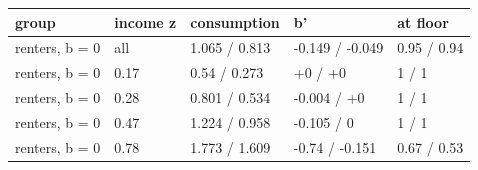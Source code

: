 \begingroup\small
\setlength{\tabcolsep}{3pt}
\renewcommand{\arraystretch}{1.04}
\begin{tabularx}{\linewidth}{XXXXX}
\toprule
group & income z & consumption & b' & at floor \\
\midrule
renters, b = 0 & all & 1.065 / 0.813 & -0.149 / -0.049 & 0.95 / 0.94 \\
renters, b = 0 & 0.17 & 0.54 / 0.273 & +0 / +0 & 1 / 1 \\
renters, b = 0 & 0.28 & 0.801 / 0.534 & -0.004 / +0 & 1 / 1 \\
renters, b = 0 & 0.47 & 1.224 / 0.958 & -0.105 / 0 & 1 / 1 \\
renters, b = 0 & 0.78 & 1.773 / 1.609 & -0.74 / -0.151 & 0.67 / 0.53 \\
\bottomrule
\end{tabularx}
\endgroup
